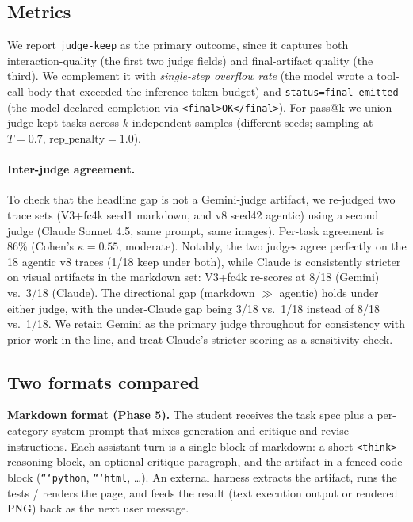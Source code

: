 \documentclass[11pt]{article}
\begin{document}
\subsection{Metrics}

We report \texttt{judge-keep} as the primary outcome, since it captures both interaction-quality (the first two judge fields) and final-artifact quality (the third). We complement it with \emph{single-step overflow rate} (the model wrote a tool-call body that exceeded the inference token budget) and \texttt{status=final emitted} (the model declared completion via \texttt{<final>OK</final>}). For pass@k we union judge-kept tasks across $k$ independent samples (different seeds; sampling at $T{=}0.7$, $\mathrm{rep\_penalty}{=}1.0$).

\paragraph{Inter-judge agreement.} To check that the headline gap is not a Gemini-judge artifact, we re-judged two trace sets (V3+fc4k seed1 markdown, and v8 seed42 agentic) using a second judge (Claude Sonnet 4.5, same prompt, same images). Per-task agreement is 86\% (Cohen's $\kappa = 0.55$, moderate). Notably, the two judges agree perfectly on the 18 agentic v8 traces (1/18 keep under both), while Claude is consistently stricter on visual artifacts in the markdown set: V3+fc4k re-scores at 8/18 (Gemini) vs.\ 3/18 (Claude). The directional gap (markdown $\gg$ agentic) holds under either judge, with the under-Claude gap being 3/18 vs.\ 1/18 instead of 8/18 vs.\ 1/18. We retain Gemini as the primary judge throughout for consistency with prior work in the line, and treat Claude's stricter scoring as a sensitivity check.

\subsection{Two formats compared}

\textbf{Markdown format (Phase 5).} The student receives the task spec plus a per-category system prompt that mixes generation and critique-and-revise instructions. Each assistant turn is a single block of markdown: a short \texttt{<think>} reasoning block, an optional critique paragraph, and the artifact in a fenced code block (\texttt{```python}, \texttt{```html}, \ldots). An external harness extracts the artifact, runs the tests / renders the page, and feeds the result (text execution output or rendered PNG) back as the next user message.
\end{document}
